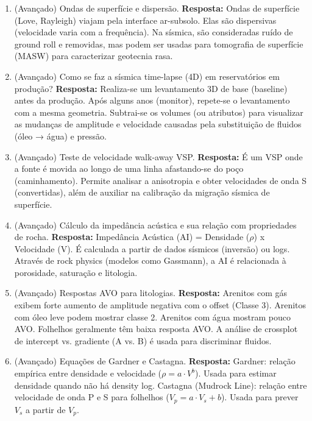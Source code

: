 \documentclass[11pt,a4paper]{article}
\begin{document}
\begin{enumerate}
  \item (Avançado) Ondas de superfície e dispersão.
  \textbf{Resposta:} Ondas de superfície (Love, Rayleigh) viajam pela interface ar-subsolo. Elas são dispersivas (velocidade varia com a frequência). Na sísmica, são consideradas ruído de ground roll e removidas, mas podem ser usadas para tomografia de superfície (MASW) para caracterizar geotecnia rasa.

  \item (Avançado) Como se faz a sísmica time-lapse (4D) em reservatórios em produção?
  \textbf{Resposta:} Realiza-se um levantamento 3D de base (baseline) antes da produção. Após alguns anos (monitor), repete-se o levantamento com a mesma geometria. Subtrai-se os volumes (ou atributos) para visualizar as mudanças de amplitude e velocidade causadas pela substituição de fluidos (óleo → água) e pressão.

  \item (Avançado) Teste de velocidade walk-away VSP.
  \textbf{Resposta:} É um VSP onde a fonte é movida ao longo de uma linha afastando-se do poço (caminhamento). Permite analisar a anisotropia e obter velocidades de onda S (convertidas), além de auxiliar na calibração da migração sísmica de superfície.

  \item (Avançado) Cálculo da impedância acústica e sua relação com propriedades de rocha.
  \textbf{Resposta:} Impedância Acústica (AI) = Densidade ($\rho$) x Velocidade (V). É calculada a partir de dados sísmicos (inversão) ou logs. Através de rock physics (modelos como Gassmann), a AI é relacionada à porosidade, saturação e litologia.

  \item (Avançado) Respostas AVO para litologias.
  \textbf{Resposta:} Arenitos com gás exibem forte aumento de amplitude negativa com o offset (Classe 3). Arenitos com óleo leve podem mostrar classe 2. Arenitos com água mostram pouco AVO. Folhelhos geralmente têm baixa resposta AVO. A análise de crossplot de intercept vs. gradiente (A vs. B) é usada para discriminar fluidos.

  \item (Avançado) Equações de Gardner e Castagna.
  \textbf{Resposta:} Gardner: relação empírica entre densidade e velocidade ($\rho = a \cdot V^b$). Usada para estimar densidade quando não há density log. Castagna (Mudrock Line): relação entre velocidade de onda P e S para folhelhos ($V_p = a \cdot V_s + b$). Usada para prever $V_s$ a partir de $V_p$.


\end{enumerate}
\end{document}
